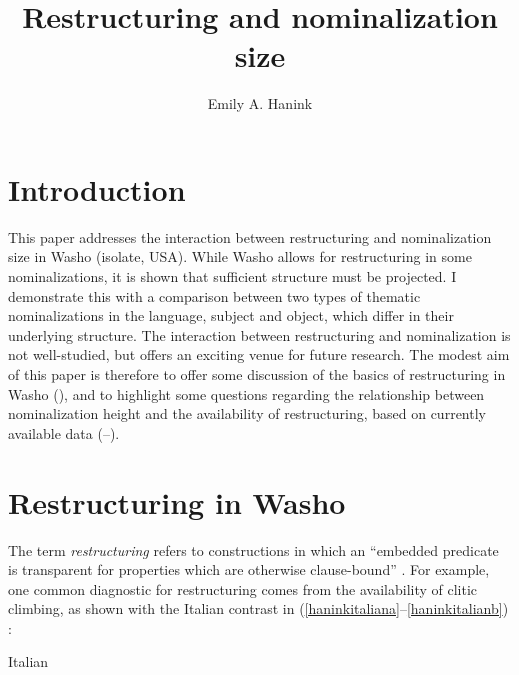 \documentclass[output=paper]{langscibook}
\author{Emily A. Hanink\affiliation{The University of Manchester}}
\title{Restructuring and nominalization size}
\begin{document}
\maketitle

\section{Introduction}

 This paper addresses the interaction between restructuring and nominalization size in Washo (isolate, USA). While Washo allows for restructuring in some nominalizations, it is shown that sufficient structure must be projected. I demonstrate this with a comparison between two types of thematic nominalizations in the language, subject and object, which differ in their underlying structure. The interaction between restructuring and nominalization is not well-studied, but offers an exciting venue for future research. The modest aim of this paper is therefore to offer some discussion of the  basics of restructuring in Washo (), and to highlight some questions regarding the relationship between nominalization height and the availability of restructuring, based on currently available data (--).

\section{Restructuring in Washo}\label{haninksec:2}


The term {\itshape restructuring} refers to constructions in which an ``embedded predicate is transparent
for properties which are otherwise clause-bound'' \citep[248]{wurmbrand2015}. For example, one common diagnostic for restructuring comes from the availability of clitic climbing, as shown with the Italian contrast in (\ref{haninkitaliana}--\ref{haninkitalianb}) \citep[991--992]{Wurmbrand2004}:

\ea Italian\\
 \z
\z
 
\end{document}
